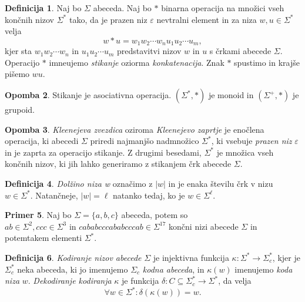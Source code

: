 \documentclass{amsart}
\theoremstyle{definition}
\newtheorem{definicija}{Definicija}[section]
\newtheorem{primer}[definicija]{Primer}
\newtheorem{opomba}[definicija]{Opomba}
\theoremstyle{plain} %
\begin{document}
\begin{definicija}
    
    Naj bo $\Sigma$ abeceda. Naj bo $*$ binarna operacija na množici vseh končnih nizov $ \Sigma^* $
    tako, da je prazen niz $\varepsilon$ nevtralni element in za niza $ w, u \in \Sigma^* $ velja
    \[
        w*u = w_1w_2 \cdots w_nu_1u_2 \cdots u_m,
    \]
    kjer sta $ w_1w_2 \cdots w_n $ in $ u_1u_2 \cdots u_m $ predstavitvi nizov $ w $ in $ u $ s 
    črkami abecede $ \Sigma $. Operacijo $*$ imneujemo \textit{stikanje} oziorma
    \textit{konkatenacija}. Znak $*$ spustimo in krajše pišemo $ wu $.
    
\end{definicija}

\begin{opomba}

    Stikanje je asociativna operacija. $ (\Sigma^*, *) $ je monoid in $ (\Sigma^+, *) $ je grupoid.

\end{opomba}

\begin{opomba}
    
    \textit{Kleenejeva zvezdica} oziroma \textit{Kleenejevo zaprtje} je enočlena operacija, ki 
    abecedi $\Sigma$ priredi najmanjšo nadmnožico $ \Sigma^* $, ki vsebuje \textit{prazen niz} 
    $\varepsilon$ in je zaprta za operacijo stikanje. Z drugimi besedami, $ \Sigma^* $ je množica
    vseh končnih nizov, ki jih lahko generiramo z stikanjem črk abecede $\Sigma$.
    
\end{opomba}

\begin{definicija}
    
    \textit{Dolžino niza w} označimo z $|w|$ in je enaka številu črk v nizu $ w \in \Sigma^* $.
    Natančneje, $ |w| = \ell $ natanko tedaj, ko je $ w \in \Sigma^\ell $. 

\end{definicija}

\begin{primer}
    
    Naj bo $ \Sigma = \{ a,b,c \} $ abeceda, potem so $ \mathit{ab} \in \Sigma^2, \mathit{ccc}
    \in \Sigma^3\text{ in } \mathit{cababcccababcccab} \in \Sigma^{17} $ končni nizi abecede
    $\Sigma$ in potemtakem elementi $ \Sigma^* $.

\end{primer}

\begin{definicija}
    
    \textit{Kodiranje nizov abecede} $\Sigma$ je injektivna funkcija $ \kappa \colon \Sigma^* \to
    \Sigma_c^* $, kjer je $ \Sigma_c^* $ neka abeceda, ki jo imenujemo $ \Sigma_c $
    \textit{kodna abeceda}, in $ \kappa(w) $ imenujemo \textit{koda niza} $ w $. 
    \textit{Dekodiranje kodiranja} $\kappa$ je funkcija  $ \delta \colon C \subseteq \Sigma^*_c 
    \to \Sigma^* $, da velja
    \[
        \forall w \in \Sigma^* \colon \delta(\kappa(w)) = w.
    \]

\end{definicija}
\end{document}
